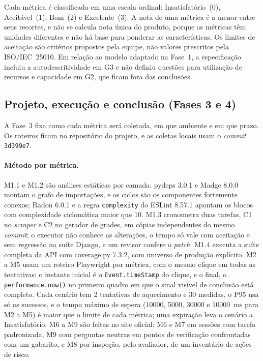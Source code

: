 \documentclass[12pt]{article}
\begin{document}
Cada métrica é classificada em uma escala ordinal: Insatisfatório~(0),
Aceitável~(1), Bom~(2) e Excelente~(3). A nota de uma métrica é a menor entre
seus recortes, e não se calcula nota única do produto, porque as métricas têm
unidades diferentes e não há base para ponderar as características. Os limites
de aceitação são critérios propostos pela equipe, não valores prescritos pela
ISO/IEC~25010. Em relação ao modelo adaptado na Fase~1, a especificação incluiu
a autodescritividade em G3 e não definiu questões para utilização de recursos e
capacidade em G2, que ficam fora das conclusões.

\subsection{Projeto, execução e conclusão (Fases 3 e 4)}\label{subsec:fases34}

A Fase~3 fixa como cada métrica será coletada, em que ambiente e em que prazo.
Os roteiros ficam no repositório do projeto, e as coletas locais usam o
\textit{commit} \texttt{3d399e7}.

\paragraph{Método por métrica.}
M1.1 e M1.2 são análises estáticas por camada: pydeps 3.0.1 e Madge 8.0.0 montam o
grafo de importações, e os ciclos são os componentes fortemente conexos; Radon
6.0.1 e a regra \texttt{complexity} do ESLint 8.57.1 apontam os blocos com
complexidade ciclomática maior que 10. M1.3 cronometra duas tarefas, C1 no
\textit{scraper} e C2 no gerador de grades, em cópias independentes do mesmo
\textit{commit}; o executor não conhece as alterações, o tempo só vale com
aceitação e sem regressão na suíte Django, e um revisor confere o \textit{patch}.
M1.4 executa a suíte completa da API com coverage.py 7.3.2, com universo de
produção explícito. M2 a M5 usam um roteiro Playwright por métrica, com o mesmo
clique em todas as tentativas: o instante inicial é o \texttt{Event.timeStamp} do
clique, e o final, o \texttt{performance.now()} no primeiro quadro em que o sinal
visível de conclusão está completo. Cada cenário tem 2 tentativas de aquecimento e
30 medidas, o P95 usa só os sucessos, e o tempo máximo de espera (10000, 5000,
30000 e 10000~ms para M2 a M5) é maior que o limite de cada métrica; uma
expiração leva o cenário a Insatisfatório. M6 a M9 são feitas no site oficial: M6
e M7 em sessões com tarefa padronizada, M9 com perguntas neutras em pontos de
verificação confrontadas com um gabarito, e M8 por inspeção, pelo avaliador, de um
inventário de ações de risco.
\end{document}
